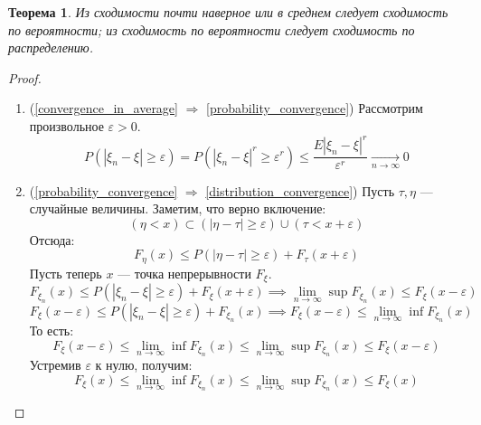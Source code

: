 \documentclass[11pt,openany,a4paper]{scrartcl}
\theoremstyle{plain}
\newtheorem{theorem}{Теорема}[subsection]
\theoremstyle{definition}
\newcommand{\underto}[1]{\xrightarrow[#1]{}}
\begin{document}
\begin{theorem}
    Из сходимости почти наверное или в среднем следует сходимость по вероятности;
    из сходимость по вероятности следует сходимость по распределению.
\end{theorem}
\begin{proof}
\mbox{}
    \begin{enumerate}
        \item
        (\ref{convergence_in_average} $\Rightarrow$
        \ref{probability_convergence})
        Рассмотрим произвольное $\varepsilon > 0$.
        $$
        P(|\xi_n - \xi| \geqslant \varepsilon) =
        P(|\xi_n - \xi|^r \geqslant \varepsilon^r) \leqslant
        \frac{E|\xi_n - \xi|^r}{\varepsilon^r} \underto{n \to \infty} 0
        $$
        \item
        (\ref{probability_convergence} $\Rightarrow$ 
        \ref{distribution_convergence})
        Пусть $\tau, \eta$ — случайные величины. Заметим, что верно включение:
        $$
        (\eta < x) \subset (|\eta - \tau| \geqslant \varepsilon) \cup
        (\tau < x + \varepsilon )
        $$
        Отсюда:
        $$
        F_\eta(x) \leqslant P(|\eta - \tau| \geqslant \varepsilon) +
        F_\tau(x + \varepsilon)
        $$
        Пусть теперь $x$ — точка непрерывности $F_\xi$.
        $$
        F_{\xi_n}(x) \leqslant P(|\xi_n - \xi| \geqslant \varepsilon) +
        F_\xi(x + \varepsilon) \implies
        \lim\limits_{n \to \infty} \sup F_{\xi_n}(x) \leqslant
        F_\xi(x - \varepsilon)
        $$
        $$
        F_\xi(x - \varepsilon) \leqslant P(|\xi_n - \xi| \geqslant \varepsilon) +
        F_{\xi_n}(x) \implies
        F_\xi(x - \varepsilon) \leqslant
        \lim\limits_{n \to \infty} \inf F_{\xi_n}(x)
        $$
        То есть:
        $$
        F_\xi(x - \varepsilon) \leqslant
        \lim\limits_{n \to \infty} \inf F_{\xi_n}(x) \leqslant
        \lim\limits_{n \to \infty} \sup F_{\xi_n}(x) \leqslant
        F_\xi(x - \varepsilon)
        $$
        Устремив $\varepsilon$ к нулю, получим:
        $$
        F_\xi(x) \leqslant
        \lim\limits_{n \to \infty} \inf F_{\xi_n}(x) \leqslant
        \lim\limits_{n \to \infty} \sup F_{\xi_n}(x) \leqslant
        F_\xi(x)
        $$
        

\end{enumerate}
\end{proof}
\end{document}
